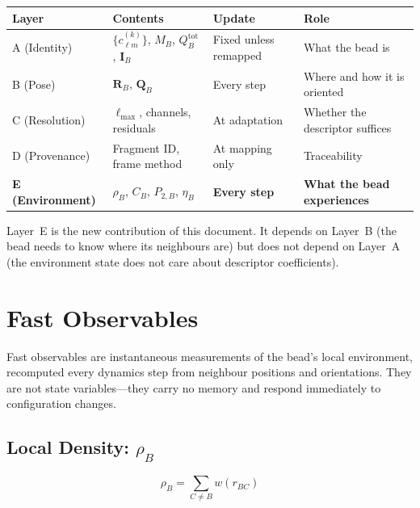 \documentclass[11pt]{article}
\begin{document}
\begin{center}
\begin{tabular}{llll}
    \textbf{Layer} & \textbf{Contents} & \textbf{Update} & \textbf{Role} \\
    \hline
    A (Identity)      & $\{c_{\ell m}^{(k)}\}$, $M_B$, $Q_B^{\mathrm{tot}}$, $\mathbf{I}_B$
                      & Fixed unless remapped & What the bead is \\
    B (Pose)          & $\mathbf{R}_B$, $\mathbf{Q}_B$
                      & Every step & Where and how it is oriented \\
    C (Resolution)    & $\ell_{\max}$, channels, residuals
                      & At adaptation & Whether the descriptor suffices \\
    D (Provenance)    & Fragment ID, frame method
                      & At mapping only & Traceability \\
    \textbf{E (Environment)} & $\rho_B$, $C_B$, $P_{2,B}$, $\eta_B$
                      & \textbf{Every step} & \textbf{What the bead experiences} \\
\end{tabular}
\end{center}

Layer~E is the new contribution of this document.  It depends on Layer~B
(the bead needs to know where its neighbours are) but does not depend on
Layer~A (the environment state does not care about descriptor coefficients).

\section{Fast Observables}

Fast observables are instantaneous measurements of the bead's local
environment, recomputed every dynamics step from neighbour positions and
orientations.  They are not state variables---they carry no memory and
respond immediately to configuration changes.

\subsection{Local Density: $\rho_B$}

\begin{equation}
    \rho_B = \sum_{C \neq B} w(r_{BC})
\end{equation}
\end{document}
